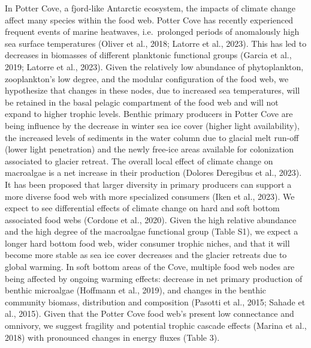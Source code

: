 \documentclass[
]{article}
\begin{document}
In Potter Cove, a fjord-like Antarctic ecosystem, the impacts of climate
change affect many species within the food web. Potter Cove has recently
experienced frequent events of marine heatwaves, i.e.~prolonged periods
of anomalously high sea surface temperatures (Oliver et al., 2018;
Latorre et al., 2023). This has led to decreases in biomasses of
different planktonic functional groups (Garcia et al., 2019; Latorre et
al., 2023). Given the relatively low abundance of phytoplankton,
zooplankton's low degree, and the modular configuration of the food web,
we hypothesize that changes in these nodes, due to increased sea
temperatures, will be retained in the basal pelagic compartment of the
food web and will not expand to higher trophic levels. Benthic primary
producers in Potter Cove are being influence by the decrease in winter
sea ice cover (higher light availability), the increased levels of
sediments in the water column due to glacial melt run-off (lower light
penetration) and the newly free-ice areas available for colonization
associated to glacier retreat. The overall local effect of climate
change on macroalgae is a net increase in their production (Dolores
Deregibus et al., 2023). It has been proposed that larger diversity in
primary producers can support a more diverse food web with more
specialized consumers (Iken et al., 2023). We expect to see differential
effects of climate change on hard and soft bottom associated food webs
(Cordone et al., 2020). Given the high relative abundance and the high
degree of the macroalgae functional group (Table S1), we expect a longer
hard bottom food web, wider consumer trophic niches, and that it will
become more stable as sea ice cover decreases and the glacier retreats
due to global warming. In soft bottom areas of the Cove, multiple food
web nodes are being affected by ongoing warming effects: decrease in net
primary production of benthic microalgae (Hoffmann et al., 2019), and
changes in the benthic community biomass, distribution and composition
(Pasotti et al., 2015; Sahade et al., 2015). Given that the Potter Cove
food web's present low connectance and omnivory, we suggest fragility
and potential trophic cascade effects (Marina et al., 2018) with
pronounced changes in energy fluxes (Table 3).
\end{document}

